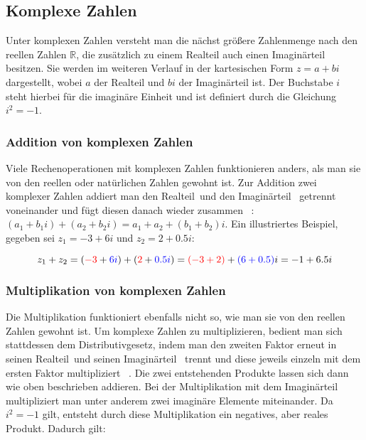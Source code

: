 \subsection{Komplexe Zahlen}\label{subsec:complex-numbers}

Unter komplexen Zahlen versteht man die nächst größere Zahlenmenge nach den reellen
Zahlen $\mathbb{R}$, die zus\"atzlich zu einem Realteil auch einen Imagin\"arteil
besitzen.
Sie werden im weiteren Verlauf in der kartesischen Form
\(z = a + bi\) dargestellt, wobei \(a\) der Realteil und \(bi\) der Imagin\"arteil ist.
Der Buchstabe \(i\) steht hierbei für die imaginäre Einheit und
ist definiert durch die Gleichung \(i^2 = -1\).

\subsubsection{Addition von komplexen Zahlen}\label{subsubsec:addition-of-complex-numbers}

Viele Rechenoperationen mit komplexen Zahlen funktionieren anders, als man sie
von den reellen oder natürlichen Zahlen gewohnt ist.
Zur Addition zwei komplexer Zahlen addiert man den
\begingroup\color{red}Realteil\endgroup~und den
\begingroup\color{blue}Imagin\"arteil\endgroup
~getrennt voneinander und fügt diesen danach wieder zusammen
~\cite{lichtenegger_komplexe_2002}:
\((a_1 + {b_1}i) + (a_2 + {b_2}i) = a_1 + a_2 + (b_1 + b_2)i\).
Ein illustriertes Beispiel, gegeben sei \(z_1 = -3 + 6i\) und \(z_2 = 2 + 0.5i\):

\begin{equation}\label{eq:complex-numbers-addition-example}
  z_1 + z_2
  = (\begingroup\color{red} -3\endgroup + \begingroup\color{blue} 6i\endgroup)
    + (\begingroup\color{red} 2\endgroup + \begingroup\color{blue} 0.5i\endgroup)
  = \begingroup\color{red} (-3 + 2)\endgroup + \begingroup\color{blue} (6 + 0.5)\endgroup i
  = -1 + 6.5i
\end{equation}

\subsubsection{Multiplikation von komplexen Zahlen}\label{subsubsec:multiplication-of-complex-numbers}

Die Multiplikation funktioniert ebenfalls nicht so, wie man sie von den
reellen Zahlen gewohnt ist.
Um komplexe Zahlen zu multiplizieren, bedient man sich stattdessen dem Distributivgesetz,
indem man den zweiten Faktor erneut in seinen
\begingroup\color{red}Realteil\endgroup~und seinen
\begingroup\color{blue}Imagin\"arteil\endgroup
~trennt und diese jeweils einzeln mit dem ersten Faktor multipliziert
~\cite{lichtenegger_komplexe_2002}.
Die zwei entstehenden Produkte lassen sich dann wie oben beschrieben addieren.
Bei der Multiplikation mit dem Imagin\"arteil multipliziert man unter anderem
zwei imagin\"are Elemente miteinander.
Da \(i^2 = -1\) gilt, entsteht durch diese Multiplikation
ein negatives, aber reales Produkt.
Dadurch gilt:

